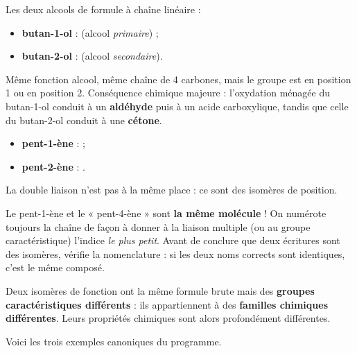 \documentclass[11pt]{article}
\newcommand{\cle}[1]{{\popxbold\color{popdark}#1}}
\newcounter{popsec}
\newcounter{popsub}
\newcommand{\courssub}[1]{%
  \stepcounter{popsub}%
  \par\vspace{9pt}\noindent{\popxbold\fontsize{11.5}{13}\selectfont\color{popink}{\color{poporange}\thepopsec.\thepopsub}\hspace{6pt}#1}\par\nopagebreak\vspace{4pt}
}
\begin{document}
\begin{exemplebox}
Les deux alcools de formule  à chaîne linéaire :
\begin{itemize}
\item \textbf{butan-1-ol} :  (alcool \emph{primaire}) ;
\item \textbf{butan-2-ol} :  (alcool \emph{secondaire}).
\end{itemize}
Même fonction alcool, même chaîne de 4 carbones, mais le groupe  est en position 1 ou en position 2. Conséquence chimique majeure : l'oxydation ménagée du butan-1-ol conduit à un \textbf{aldéhyde} puis à un acide carboxylique, tandis que celle du butan-2-ol conduit à une \textbf{cétone}.
\end{exemplebox}

\begin{exemplebox}
\begin{itemize}
\item \textbf{pent-1-ène} :  ;
\item \textbf{pent-2-ène} : .
\end{itemize}
La double liaison  n'est pas à la même place : ce sont des isomères de position.
\end{exemplebox}

\begin{attention}
Le pent-1-ène et le « pent-4-ène » sont \textbf{la même molécule} ! On numérote toujours la chaîne de façon à donner à la liaison multiple (ou au groupe caractéristique) l'indice \emph{le plus petit}. Avant de conclure que deux écritures sont des isomères, vérifie la nomenclature : si les deux noms corrects sont identiques, c'est le même composé.
\end{attention}

\courssub{Isomérie de fonction}

\begin{definition}
Deux isomères de \cle{fonction} ont la même formule brute mais des \textbf{groupes caractéristiques différents} : ils appartiennent à des \textbf{familles chimiques différentes}. Leurs propriétés chimiques sont alors profondément différentes.
\end{definition}

Voici les trois exemples canoniques du programme.
\end{document}
